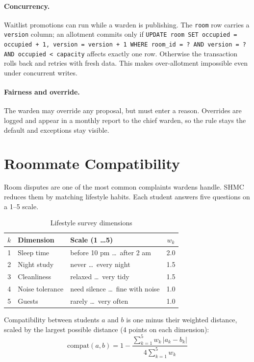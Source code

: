 \documentclass[11pt,a4paper]{report}
\begin{document}
\paragraph{Concurrency.} Waitlist promotions can run while a warden is publishing. The \texttt{room} row carries a \texttt{version} column; an allotment commits only if \texttt{UPDATE room SET occupied = occupied + 1, version = version + 1 WHERE room\_id = ? AND version = ? AND occupied < capacity} affects exactly one row. Otherwise the transaction rolls back and retries with fresh data. This makes over-allotment impossible even under concurrent writes.

\paragraph{Fairness and override.} The warden may override any proposal, but must enter a reason. Overrides are logged and appear in a monthly report to the chief warden, so the rule stays the default and exceptions stay visible.

\section{Roommate Compatibility}\label{sec:compat}
Room disputes are one of the most common complaints wardens handle. SHMC reduces them by matching lifestyle habits. Each student answers five questions on a 1--5 scale.

\begin{table}[H]
\centering\small
\caption{Lifestyle survey dimensions}\label{tab:survey}
\begin{tabularx}{\textwidth}{clLc}
\toprule
$k$ & \textbf{Dimension} & \textbf{Scale (1 \ldots 5)} & $w_k$\\
 & Sleep time & before 10 pm \ldots\ after 2 am & 2.0\\
2 & Night study & never \ldots\ every night & 1.5\\
3 & Cleanliness & relaxed \ldots\ very tidy & 1.5\\
4 & Noise tolerance & need silence \ldots\ fine with noise & 1.0\\
5 & Guests & rarely \ldots\ very often & 1.0\\
\bottomrule
\end{tabularx}
\end{table}

Compatibility between students $a$ and $b$ is one minus their weighted distance, scaled by the largest possible distance (4 points on each dimension):
\begin{equation}
\text{compat}(a,b) = 1 - \frac{\sum_{k=1}^{5} w_k \,|a_k - b_k|}{4\sum_{k=1}^{5} w_k}
\end{equation}
\end{document}
